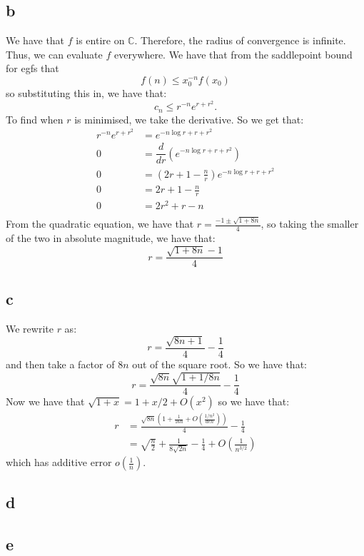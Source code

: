 \documentclass[]{article}
\begin{document}
\subsection{b}
We have that $f$ is entire on $\mathbb{C}$. Therefore, the radius of convergence is infinite. Thus, we can evaluate $f$ everywhere. We have that from the saddlepoint bound for egfs that
\begin{equation}
	[x^n] f(n) \leq x_0^{-n} f(x_0)
\end{equation}
so substituting this in, we have that:
\begin{equation}
	c_n \leq r^{-n} e^{r + r^2}.
\end{equation}
To find when $r$ is minimised, we take the derivative. So we get that:
\begin{align*}
	 r^{-n} e^{r + r^2} &= e^{-n \log r + r + r^2}\\
	 0 &= \dfrac{d}{dr}(e^{-n \log r + r + r^2}) \\
	 0 &= \left(2r + 1 - \frac{n}{r}\right) e^{-n \log r + r + r^2}\\
	 0 &= 2r + 1 - \frac{n}{r}\\
	 0 &= 2r^2 + r - n\\
\end{align*}
From the quadratic equation, we have that $r = \frac{-1 \pm \sqrt{1 + 8n}}{4}$, so taking the smaller of the two in absolute magnitude, we have that:
\begin{equation}
	r = \frac{\sqrt{1 + 8n} - 1}{4}
\end{equation}

\subsection{c}
We rewrite $r$ as:
\begin{equation}
	r = \frac{\sqrt{8n + 1}}{4} - \frac{1}{4}
\end{equation}
and then take a factor of $8n$ out of the square root. So we have that:
\begin{equation}
	r = \frac{\sqrt{8n}\sqrt{1+ 1/8n}}{4} - \frac{1}{4}
\end{equation}
Now we have that $\sqrt{1 + x} = 1 + x/2 + O(x^2)$ so we have that:
\begin{align*}
	r &= \frac{\sqrt{8n}\left(1 + \frac{1}{16n} + O(\frac{1/n^2}{den})\right)}{4} - \frac{1}{4}\\
	&= \sqrt{\frac{n}{2}} + \frac{1}{8 \sqrt{2 n}} - \frac{1}{4} + O(\frac{1}{n^{3/2}})
\end{align*}
which has additive error $o(\frac{1}{n})$. 

\subsection{d}

\subsection{e}
\end{document}
